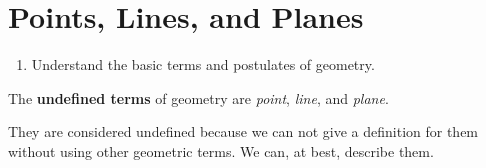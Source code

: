 \documentclass{article}
\begin{document}
\section*{Points, Lines, and Planes}

\begin{tcolorbox}[colframe=orange!70!white, coltitle=black, title=\textbf{Today I Can}]
\begin{enumerate}
    \item Understand the basic terms and postulates of geometry.
\end{enumerate}
\end{tcolorbox}

\begin{tcolorbox}[
colframe=black!20!white, 
opacitybacktitle=0.1,
coltitle=black, title=\textbf{Undefined Terms}]
The \textbf{undefined terms} of geometry are \emph{point}, \emph{line}, and \emph{plane}. \newline 

They are considered undefined because we can not give a definition for them without using other geometric terms. We can, at best, describe them.
\end{tcolorbox}
\end{document}
